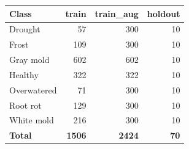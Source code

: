 \begin{tabular}{lrrr}
\toprule
Class & train & train\_aug & holdout \\
\midrule
Drought & 57 & 300 & 10 \\
Frost & 109 & 300 & 10 \\
Gray mold & 602 & 602 & 10 \\
Healthy & 322 & 322 & 10 \\
Overwatered & 71 & 300 & 10 \\
Root rot & 129 & 300 & 10 \\
White mold & 216 & 300 & 10 \\
\textbf{Total} & \textbf{1506} & \textbf{2424} & \textbf{70} \\
\bottomrule
\end{tabular}
